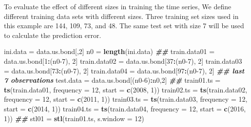 \documentclass[
]{book}
\newenvironment{Shaded}{\begin{snugshade}}{\end{snugshade}}
\newcommand{\AttributeTok}[1]{\textcolor[rgb]{0.13,0.29,0.53}{#1}}
\newcommand{\DecValTok}[1]{\textcolor[rgb]{0.00,0.00,0.81}{#1}}
\newcommand{\DocumentationTok}[1]{\textcolor[rgb]{0.56,0.35,0.01}{\textbf{\textit{#1}}}}
\newcommand{\FunctionTok}[1]{\textcolor[rgb]{0.13,0.29,0.53}{\textbf{#1}}}
\newcommand{\NormalTok}[1]{#1}
\newcommand{\OtherTok}[1]{\textcolor[rgb]{0.56,0.35,0.01}{#1}}
\newcommand{\SpecialCharTok}[1]{\textcolor[rgb]{0.81,0.36,0.00}{\textbf{#1}}}
\begin{document}
To evaluate the effect of different sizes in training the time series, We define different training data sets with different sizes. Three training set sizes used in this example are 144, 109, 73, and 48. The same test set with size 7 will be used to calculate the prediction error.

\begin{Shaded}
\begin{Highlighting}[]
\NormalTok{ini.data }\OtherTok{=}\NormalTok{ data.us.bond[,}\DecValTok{2}\NormalTok{]}
\NormalTok{n0 }\OtherTok{=} \FunctionTok{length}\NormalTok{(ini.data)}
\DocumentationTok{\#\#}
\NormalTok{train.data01 }\OtherTok{=}\NormalTok{ data.us.bond[}\DecValTok{1}\SpecialCharTok{:}\NormalTok{(n0}\DecValTok{{-}7}\NormalTok{), }\DecValTok{2}\NormalTok{]}
\NormalTok{train.data02 }\OtherTok{=}\NormalTok{ data.us.bond[}\DecValTok{37}\SpecialCharTok{:}\NormalTok{(n0}\DecValTok{{-}7}\NormalTok{), }\DecValTok{2}\NormalTok{]}
\NormalTok{train.data03 }\OtherTok{=}\NormalTok{ data.us.bond[}\DecValTok{73}\SpecialCharTok{:}\NormalTok{(n0}\DecValTok{{-}7}\NormalTok{), }\DecValTok{2}\NormalTok{]}
\NormalTok{train.data04 }\OtherTok{=}\NormalTok{ data.us.bond[}\DecValTok{97}\SpecialCharTok{:}\NormalTok{(n0}\DecValTok{{-}7}\NormalTok{), }\DecValTok{2}\NormalTok{]}
\DocumentationTok{\#\# last 7 observations}
\NormalTok{test.data }\OtherTok{=}\NormalTok{ data.us.bond[(n0}\DecValTok{{-}6}\NormalTok{)}\SpecialCharTok{:}\NormalTok{n0,}\DecValTok{2}\NormalTok{]}
\DocumentationTok{\#\#}
\NormalTok{train01.ts }\OtherTok{=} \FunctionTok{ts}\NormalTok{(train.data01, }\AttributeTok{frequency =} \DecValTok{12}\NormalTok{, }\AttributeTok{start =} \FunctionTok{c}\NormalTok{(}\DecValTok{2008}\NormalTok{, }\DecValTok{1}\NormalTok{))}
\NormalTok{train02.ts }\OtherTok{=} \FunctionTok{ts}\NormalTok{(train.data02, }\AttributeTok{frequency =} \DecValTok{12}\NormalTok{, }\AttributeTok{start =} \FunctionTok{c}\NormalTok{(}\DecValTok{2011}\NormalTok{, }\DecValTok{1}\NormalTok{))}
\NormalTok{train03.ts }\OtherTok{=} \FunctionTok{ts}\NormalTok{(train.data03, }\AttributeTok{frequency =} \DecValTok{12}\NormalTok{, }\AttributeTok{start =} \FunctionTok{c}\NormalTok{(}\DecValTok{2014}\NormalTok{, }\DecValTok{1}\NormalTok{))}
\NormalTok{train04.ts }\OtherTok{=} \FunctionTok{ts}\NormalTok{(train.data04, }\AttributeTok{frequency =} \DecValTok{12}\NormalTok{, }\AttributeTok{start =} \FunctionTok{c}\NormalTok{(}\DecValTok{2016}\NormalTok{, }\DecValTok{1}\NormalTok{))}
\DocumentationTok{\#\#}
\NormalTok{stl01 }\OtherTok{=} \FunctionTok{stl}\NormalTok{(train01.ts, }\AttributeTok{s.window =} \DecValTok{12}\NormalTok{)}

\end{Highlighting}
\end{Shaded}
\end{document}
